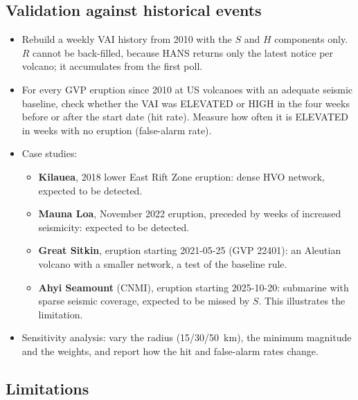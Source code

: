 \documentclass[11pt,a4paper]{article}
\begin{document}
\subsection{Validation against historical events}

\begin{itemize}
  \item Rebuild a weekly VAI history from 2010 with the $S$ and $H$ components only.
  $R$ cannot be back-filled, because HANS returns only the latest notice per volcano;
  it accumulates from the first poll.
  \item For every GVP eruption since 2010 at US volcanoes with an adequate seismic
  baseline, check whether the VAI was ELEVATED or HIGH in the four weeks before or
  after the start date (hit rate). Measure how often it is ELEVATED in weeks with no
  eruption (false-alarm rate).
  \item Case studies:
  \begin{itemize}
    \item \textbf{Kilauea}, 2018 lower East Rift Zone eruption: dense HVO network,
    expected to be detected.
    \item \textbf{Mauna Loa}, November 2022 eruption, preceded by weeks of increased
    seismicity: expected to be detected.
    \item \textbf{Great Sitkin}, eruption starting 2021-05-25 (GVP 22401): an Aleutian
    volcano with a smaller network, a test of the baseline rule.
    \item \textbf{Ahyi Seamount} (CNMI), eruption starting 2025-10-20: submarine with
    sparse seismic coverage, expected to be missed by $S$. This illustrates the
    limitation.
  \end{itemize}
  \item Sensitivity analysis: vary the radius (15/30/50~km), the minimum magnitude and
  the weights, and report how the hit and false-alarm rates change.
\end{itemize}

\subsection{Limitations}
\end{document}
